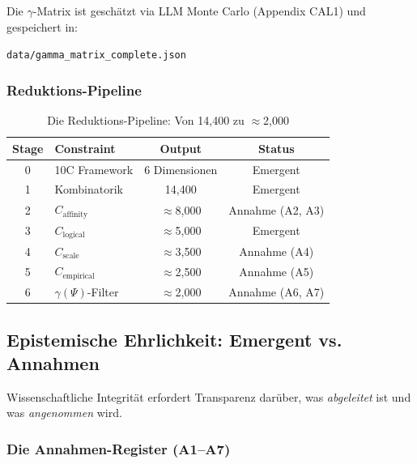 Die $\gamma$-Matrix ist geschätzt via LLM Monte Carlo (Appendix CAL1) und gespeichert in:
\begin{center}
\texttt{data/gamma\_matrix\_complete.json}
\end{center}

\subsubsection{Reduktions-Pipeline}

\begin{table}[htbp]
\centering
\caption{Die Reduktions-Pipeline: Von 14,400 zu $\approx$2,000}
\label{tab:17-reduction-pipeline}
\renewcommand{\arraystretch}{1.3}
\begin{tabular}{@{}clcc@{}}
\toprule
\textbf{Stage} & \textbf{Constraint} & \textbf{Output} & \textbf{Status} \\
\midrule
0 & 10C Framework & 6 Dimensionen & Emergent \\
1 & Kombinatorik & 14,400 & Emergent \\
2 & $C_{\text{affinity}}$ & $\approx$8,000 & Annahme (A2, A3) \\
3 & $C_{\text{logical}}$ & $\approx$5,000 & Emergent \\
4 & $C_{\text{scale}}$ & $\approx$3,500 & Annahme (A4) \\
5 & $C_{\text{empirical}}$ & $\approx$2,500 & Annahme (A5) \\
6 & $\gamma(\Psi)$-Filter & $\approx$2,000 & Annahme (A6, A7) \\
\bottomrule
\end{tabular}
\end{table}


\subsection{Epistemische Ehrlichkeit: Emergent vs. Annahmen}
\label{sec:17-epistemic}

Wissenschaftliche Integrität erfordert Transparenz darüber, was \textit{abgeleitet} ist und was \textit{angenommen} wird.

\subsubsection{Die Annahmen-Register (A1--A7)}

